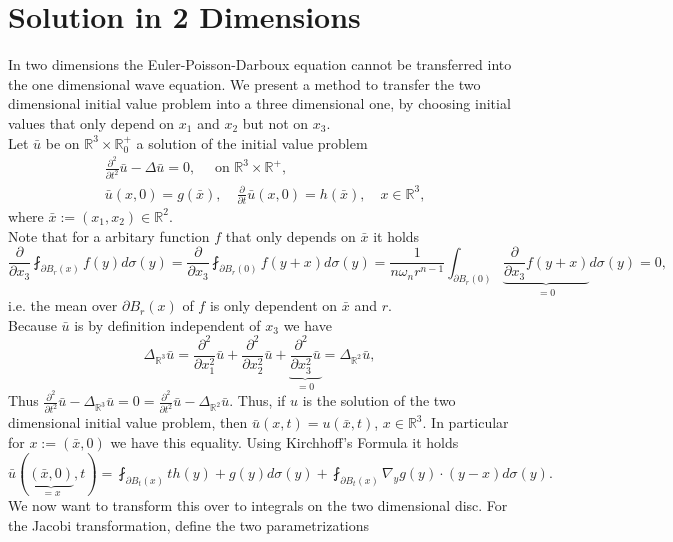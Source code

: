 \documentclass[A4,12pt,twoside]{book}
\begin{document}
    
\section{Solution in 2 Dimensions}

In two dimensions the Euler-Poisson-Darboux equation cannot be transferred into the one dimensional wave equation. We present a method to transfer the two dimensional initial value problem into a three dimensional one, by choosing initial values that only depend on $x_1$ and $x_2$ but not on $x_3$.\\
Let $\bar{u}$ be on $\mathbb{R}^3 \times \mathbb{R}^+_0$ a solution of the initial value problem
\begin{align*}
    & \frac{\partial^2}{\partial t^2} \bar{u} - \Delta \bar{u} =0, \quad \text{ on }\mathbb{R}^3 \times \mathbb{R}^+ ,\\
    & \bar{u}(x,0) = g(\bar{x}), \quad \frac{\partial}{\partial t} \bar{u}(x,0) = h(\bar{x}), \quad x \in \mathbb{R}^3,
\end{align*} 
where $\bar{x} := (x_1,x_2) \in \mathbb{R}^2$. \\
Note that for a arbitary function $f$ that only depends on $\bar{x}$ it holds
\[
\frac{\partial}{\partial x_3} \fint_{\partial B_r (x)} f(y) d \sigma (y) = \frac{\partial}{\partial x_3} \fint_{\partial B_r (0)} f(y+x) d \sigma (y) = \frac{1}{n \omega_n r^{n-1}} \int_{\partial B_r (0)}\underbrace{ \frac{\partial}{\partial x_3} f(y+x)}_{=0} d \sigma (y) =0,
\]
i.e. the mean over $\partial B_r (x)$ of $f$ is only dependent on $\bar{x}$ and $r$. \\
Because $\bar{u}$ is by definition independent of $x_3$ we have 
\[
\Delta_{\mathbb{R}^3} \bar{u} = \frac{\partial^2}{\partial x_1^2} \bar{u} + \frac{\partial^2}{\partial x_2^2} \bar{u} +  \underbrace{\frac{\partial^2}{\partial x_3^2} \bar{u}}_{=0} = \Delta_{\mathbb{R}^2} \bar{u},
\]
Thus $\frac{\partial^2}{\partial t^2} \bar{u} - \Delta_{\mathbb{R}^3} \bar{u} =0 =\frac{\partial^2}{\partial t^2} \bar{u} - \Delta_{\mathbb{R}^2} \bar{u}$. Thus, if $u$ is the solution of the two dimensional initial value problem, then $\bar{u}(x,t)= u(\bar{x},t)$, $x \in \mathbb{R}^3$. In particular for $x:= (\bar{x},0)$ we have this equality. Using Kirchhoff's Formula it holds 
\[
\bar{u}(\underbrace{(\bar{x},0)}_{=x} ,t) = \fint_{\partial B_t (x)} th (y) + g(y) d \sigma (y) + \fint_{\partial B_t (x)} \nabla_{y} g(y) \cdot (y-x) d \sigma (y).
\]
We now want to transform this over to integrals on the two dimensional disc. For the Jacobi transformation, define the two parametrizations 
\end{document}

